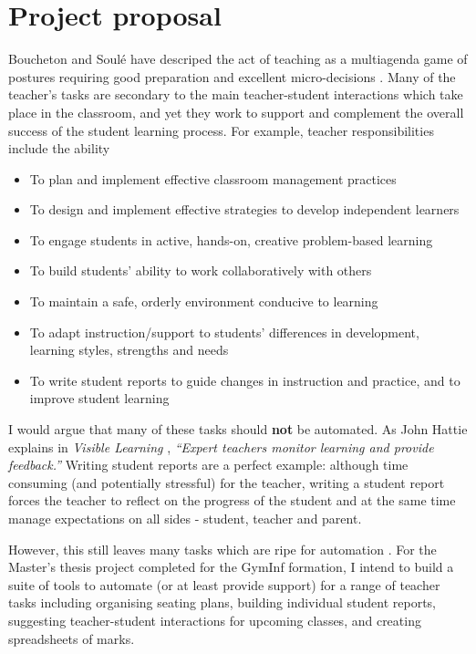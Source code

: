 \documentclass[10pt]{article}
\begin{document}
\section{Project proposal}

Boucheton and Soulé have descriped the act of teaching as a multiagenda game of postures requiring good preparation and excellent micro-decisions \cite{BS09}. Many of the teacher's tasks are secondary to the main teacher-student interactions which take place in the classroom, and yet they work to support and complement the overall success of the student learning process. For example, teacher responsibilities include the ability
\begin{itemize}
\item To plan and implement effective classroom management practices
\item To design and implement effective strategies to develop independent learners
\item To engage students in active, hands-on, creative problem-based learning
\item To build students’ ability to work collaboratively with others
\item To maintain a safe, orderly environment conducive to learning
\item To adapt instruction/support to students’ differences in development, learning styles, strengths and needs
\item To write student reports to guide changes in instruction and practice, and to improve student learning
\end{itemize}
I would argue that many of these tasks should \textbf{not} be automated. As John Hattie explains in \emph{Visible Learning} \cite{Hat12}, \emph{``Expert teachers monitor learning and provide feedback.''} Writing student reports are a perfect example: although time consuming (and potentially stressful) for the teacher, writing a student report forces the teacher to reflect on the progress of the student and at the same time manage expectations on all sides - student, teacher and parent.

However, this still leaves many tasks which are ripe for automation \cite{Swei15}. For the Master's thesis project completed for the GymInf formation, I intend to build a suite of tools to automate (or at least provide support) for a range of teacher tasks including organising seating plans, building individual student reports, suggesting teacher-student interactions for upcoming classes, and creating spreadsheets of marks.
 
\end{document}
